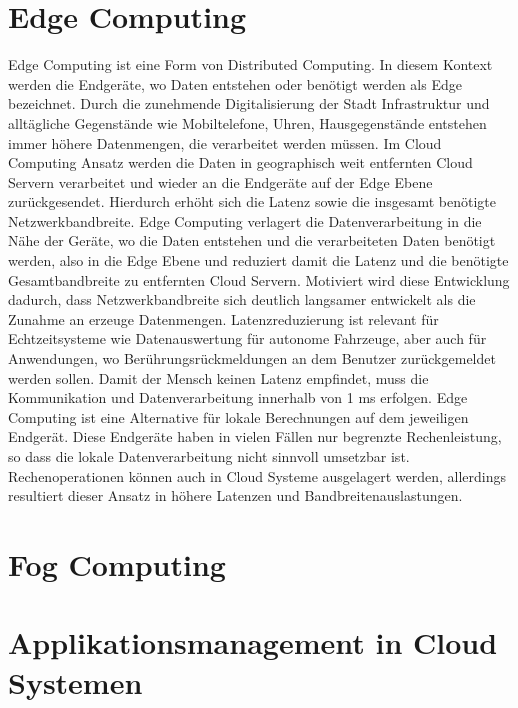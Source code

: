 \section{Edge Computing}

Edge Computing ist eine Form von Distributed Computing. In diesem Kontext werden die Endgeräte, wo Daten entstehen oder benötigt werden als Edge bezeichnet. Durch die zunehmende Digitalisierung der Stadt Infrastruktur und alltägliche Gegenstände wie Mobiltelefone, Uhren, Hausgegenstände entstehen immer höhere Datenmengen, die verarbeitet werden müssen. Im Cloud Computing Ansatz werden die Daten in geographisch weit entfernten Cloud Servern verarbeitet und wieder an die Endgeräte auf der Edge Ebene zurückgesendet. Hierdurch erhöht sich die Latenz sowie die insgesamt benötigte Netzwerkbandbreite. Edge Computing verlagert die Datenverarbeitung in die Nähe der Geräte, wo die Daten entstehen und die verarbeiteten Daten benötigt werden, also in die Edge Ebene und reduziert damit die Latenz und die benötigte Gesamtbandbreite zu entfernten Cloud Servern. \cite{Wang2019} Motiviert wird diese Entwicklung dadurch, dass Netzwerkbandbreite sich deutlich langsamer entwickelt als die Zunahme an erzeuge Datenmengen.\cite{Shi2016} Latenzreduzierung ist relevant für Echtzeitsysteme wie Datenauswertung für autonome Fahrzeuge, aber auch für Anwendungen, wo Berührungsrückmeldungen an dem Benutzer zurückgemeldet werden sollen. Damit der Mensch keinen Latenz empfindet, muss die Kommunikation und Datenverarbeitung innerhalb von 1 ms erfolgen. \cite{Varsha2017} Edge Computing ist eine Alternative für lokale Berechnungen auf dem jeweiligen Endgerät. Diese Endgeräte haben in vielen Fällen nur begrenzte Rechenleistung, so dass die lokale Datenverarbeitung nicht sinnvoll umsetzbar ist. Rechenoperationen können auch in Cloud Systeme ausgelagert werden, allerdings resultiert dieser Ansatz in höhere Latenzen und Bandbreitenauslastungen. \cite{Lin2020} 

\section{Fog Computing}



\section{Applikationsmanagement in Cloud Systemen}


